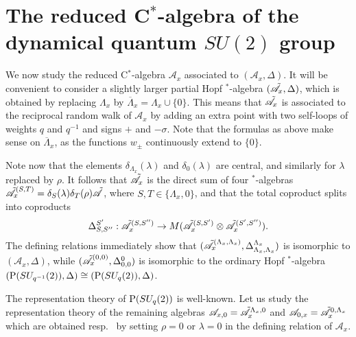 
\section{The reduced C$^*$-algebra of the dynamical quantum $SU(2)$ group}

We now study the reduced C$^*$-algebra $\mathcal{A}_x$ associated to $(\mathscr{A}_x,\Delta)$. It will be convenient to consider a slightly larger partial Hopf $^*$-algebra $(\tilde{\mathscr{A}}_x,\Delta)$, which is obtained by replacing $\Lambda_x$ by $\overline{\Lambda}_x = \Lambda_x\cup \{0\}$. This means that $\tilde{\mathscr{A}}_x$ is associated to the reciprocal random walk of $\mathscr{A}_x$ by adding an extra point with two self-loops of weights $q$ and $q^{-1}$ and signs $+$ and $-\sigma$. Note that the formulas as above make sense on $\overline{\Lambda}_x$, as the functions $w_{\pm}$ continuously extend to $\{0\}$. 

Note now that the elements $\delta_{\Lambda_x}(\lambda)$ and $\delta_0(\lambda)$ are central, and similarly for $\lambda$ replaced by $\rho$. It follows that $\tilde{\mathscr{A}}_x$ is the direct sum of four $^*$-algebras $\tilde{\mathscr{A}}_x^{(S,T)} = \delta_{S}(\lambda)\delta_T(\rho)\tilde{\mathscr{A}}$, where $S,T\in \{\Lambda_x,0\}$, and that the total coproduct splits into coproducts \[\Delta_{S,S''}^{S'}:\tilde{\mathscr{A}}_x^{(S,S'')} \rightarrow M(\tilde{\mathscr{A}}_x^{(S,S')}\otimes \tilde{\mathscr{A}}_x^{(S',S'')}).\] The defining relations immediately show that $(\tilde{\mathscr{A}}_x^{(\Lambda_x,\Lambda_x)},\Delta_{\Lambda_x,\Lambda_x}^{\Lambda_x})$ is isomorphic to $(\mathscr{A}_x,\Delta)$, while $(\tilde{\mathscr{A}}_x^{(0,0)},\Delta_{0,0}^0)$ is isomorphic to the ordinary Hopf $^*$-algebra $(\operatorname{\mathrm{P}}(SU_{q^{-1}}(2)),\Delta) \cong (\operatorname{\mathrm{P}}(SU_q(2)),\Delta)$.

The representation theory of $\operatorname{\mathrm{P}}(SU_q(2))$ is well-known. Let us study the representation theory of the remaining algebras $\mathscr{A}_{x,0} = \tilde{\mathscr{A}}_x^{\Lambda_x,0}$ and $\mathscr{A}_{0,x} = \tilde{\mathscr{A}}_x^{0,\Lambda_x}$ which are obtained resp.~ by setting $\rho=0$ or $\lambda = 0$ in the defining relation of $\mathscr{A}_x$. 

